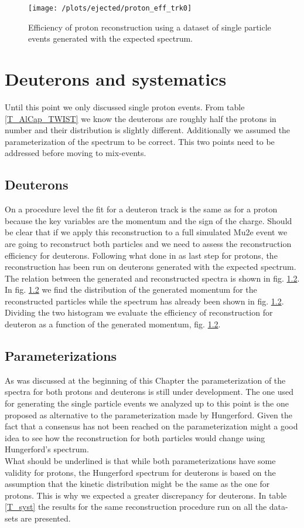 \documentclass[12pt,a4paper,openright, oneside, titlepage]{book} %
\begin{document}
\begin{figure}[!htb]
\centering
\texttt{[image: /plots/ejected/proton\_eff\_trk0]}
\caption{Efficiency of proton reconstruction using a dataset of single particle events generated with the expected spectrum.}
\label{_proton_eff_trk0}
\end{figure}

\section{Deuterons and systematics}
Until this point we only discussed single proton events. 
From table \ref{T_AlCap_TWIST} we know the deuterons are roughly half the protons in number and their distribution is slightly different.
Additionally we assumed the parameterization of the spectrum to be correct. This two points need to be addressed before moving to mix-events.

\subsection{Deuterons}
On a procedure level the fit for a deuteron track is the same as for a proton because the key variables are the momentum and the sign of the charge.
Should be clear that if we apply this reconstruction to a full simulated Mu2e event we are going to reconstruct both particles and we need to assess the reconstruction efficiency for deuterons. 
Following what done in as last step for protons, the reconstruction has been run on deuterons generated with the expected spectrum. 
The relation between the generated and reconstructed spectra is shown in fig. \ref{}.
In fig. \ref{} we find the distribution of the generated momentum for the reconstructed particles while the spectrum has already been shown in fig. \ref{}. Dividing the two histogram we evaluate the efficiency of reconstruction for deuteron as a function of the generated momentum, fig. \ref{}. 


\subsection{Parameterizations}
As was discussed at the beginning of this Chapter the parameterization of the spectra for both protons and deuterons is still under development. 
The one used for generating the single particle events we analyzed up to this point is the one proposed as alternative to the parameterization made by Hungerford. 
Given the fact that a consensus has not been reached on the parameterization might a good idea to see how the reconstruction for both particles would change using Hungerford's spectrum.\\
What should be underlined is that while both parameterizations have some validity for protons, the Hungerford spectrum for deuterons is based on the assumption that the kinetic distribution might be the same as the one for protons. This is why we expected a greater discrepancy for deuterons. 
In table \ref{T_syst} the results for the same reconstruction procedure run on all the data-sets are presented.\\
\end{document}
